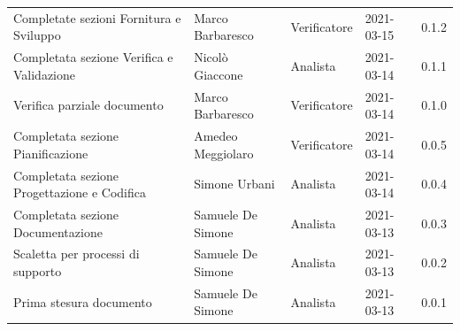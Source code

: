 \documentclass[a4paper]{article}
\begin{document}
\begin{center}
\begin{longtable}[!h]{p{160px} p{80px} p{70px} p{55px} p{40px}}
        Completate sezioni Fornitura e Sviluppo                                    & Marco Barbaresco                            & Verificatore   & 2021-03-15    & 0.1.2             \\
        Completata sezione Verifica e Validazione                                  & Nicolò Giaccone                             & Analista       & 2021-03-14    & 0.1.1             \\
        Verifica parziale documento                                                & Marco Barbaresco                            & Verificatore   & 2021-03-14    & 0.1.0             \\
        Completata sezione Pianificazione                                          & Amedeo Meggiolaro                           & Verificatore   & 2021-03-14    & 0.0.5             \\
        Completata sezione Progettazione e Codifica                                & Simone Urbani                               & Analista       & 2021-03-14    & 0.0.4             \\
        Completata sezione Documentazione                                          & Samuele De Simone                           & Analista       & 2021-03-13    & 0.0.3             \\
        Scaletta per processi di supporto                                          & Samuele De Simone                           & Analista       & 2021-03-13    & 0.0.2             \\
        Prima stesura documento                                                    & Samuele De Simone                           & Analista       & 2021-03-13    & 0.0.1             \\
    \end{longtable}
\end{center}

\newpage
\tableofcontents
\newpage





\end{document}
